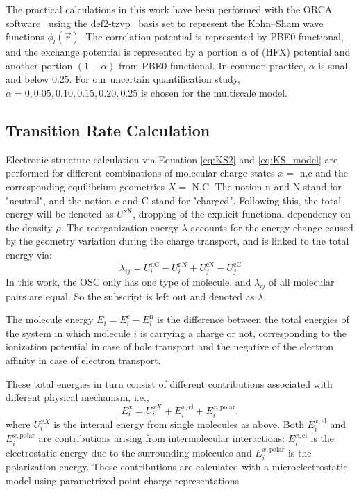 \documentclass[%
 reprint,
 amsmath,amssymb,
 aps,
]{revtex4-2}
\begin{document}
The practical calculations in this work have been performed with the ORCA software~\cite{Neese2012a} using the def2-tzvp~\cite{weigend_accurate_2006} basis set to represent the Kohn--Sham wave functions $\phi_l(\vec{r})$. 
The correlation potential is represented by PBE0 functional, and the exchange potential is represented by a portion $\alpha$ of (HFX) potential and another portion $(1-\alpha)$ from PBE0 functional. In common practice, $\alpha$ is small and below 0.25. For our uncertain quantification study, $\alpha=0,0.05,0.10,0.15,0.20,0.25$ is chosen for the multiscale model.

\subsection{Transition Rate Calculation}
Electronic structure calculation via Equation \ref{eq:KS2} and \ref{eq:KS_model} are performed for different combinations of molecular charge states $x=$ n,c and the corresponding equilibrium geometries $X=$ N,C. The notion n and N stand for "neutral", and the notion c and C stand for "charged". 
Following this, the total energy will be denoted as $U^\text{xX}$, dropping of the explicit functional dependency on the density $\rho$. 
The reorganization energy $\lambda$ accounts for the energy change caused by the geometry variation during the charge transport, and is linked to the total energy via:
%
\begin{equation}
    \lambda_{ij} = U_i^\text{nC} - U_i^\text{nN} + U_j^\text{cN} - U_j^\text{cC}
    \label{eq:lambda}
\end{equation}
%
In this work, the OSC only has one type of molecule, and $\lambda_{ij}$ of all molecular pairs are equal. So the subscript is left out and denoted as $\lambda$.

The molecule energy $E_i = E_i^\text{c} - E_i^\text{n}$ is the difference between the total energies of the system in which molecule $i$ is carrying a charge or not, corresponding to the ionization potential in case of hole transport and the negative of the electron affinity in case of electron transport. 

These total energies in turn consist of different contributions associated with different physical mechanism, i.e.,
%
\begin{equation}
E_i^x = U_i^{xX} + E_i^{x,\text{el}} + E_i^{x,\text{polar}},
\label{eq:Es}
\end{equation}
%
where $U_i^{xX}$ is the internal energy from single molecules as above.
Both $E_i^{x,\text{el}}$ and $E_i^{x,\text{polar}}$ are contributions arising from intermolecular interactions: $E_i^{x,\text{el}}$ is the electrostatic energy due to the surrounding molecules and $E_i^{x,\text{polar}}$ is the polarization energy. 
These contributions are calculated with a microelectrostatic model using parametrized point charge representations\cite{https://doi.org/10.1002/jcc.540110311}
\end{document}
